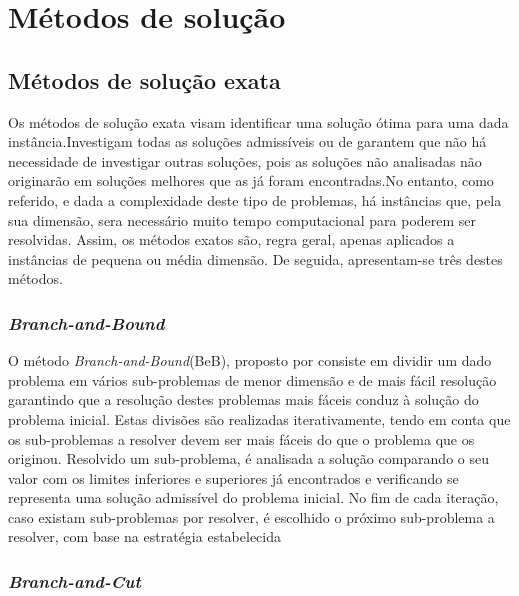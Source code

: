 ﻿\chapter{Métodos de solução}
\label{cap:Metodos_sol}

\section{Métodos de solução exata}
 

Os métodos de solução exata visam identificar uma solução ótima para uma dada instância.Investigam todas as soluções admissíveis ou de garantem que não há necessidade de investigar outras soluções, pois as soluções não analisadas não originarão em soluções melhores que as já foram encontradas.No entanto, como referido, e dada a complexidade deste tipo de problemas, há instâncias que, pela sua dimensão, sera necessário muito tempo computacional para poderem ser resolvidas. Assim, os métodos exatos são, regra geral, apenas aplicados a instâncias de pequena ou média dimensão. De seguida, apresentam-se três destes métodos.
 
\subsection{\textit{Branch-and-Bound}}

O método \textit{Branch-and-Bound}(BeB), proposto por \cite{land60}consiste em dividir um dado problema em vários sub-problemas de menor dimensão e de mais fácil resolução garantindo que a resolução destes problemas mais fáceis conduz à solução do problema inicial. Estas divisões são realizadas iterativamente, tendo em conta que os sub-problemas a resolver devem ser mais fáceis do que o problema que os originou. Resolvido um sub-problema, é analisada a solução comparando o seu valor com os limites inferiores e superiores já encontrados e verificando se representa uma solução admissível do problema inicial. No fim de cada iteração, caso existam sub-problemas por resolver, é escolhido o próximo sub-problema a resolver, com base na estratégia estabelecida

\subsection{\textit{Branch-and-Cut}}

